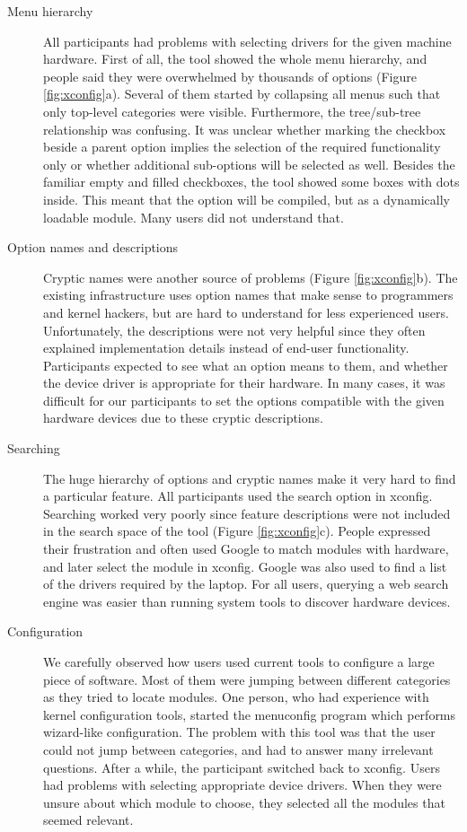 \documentclass{chi2009}
\begin{document}
\begin{description}
  \item[Menu hierarchy]
All participants had problems with selecting drivers for the given machine hardware. First of all, the tool showed the whole menu hierarchy, and people said
they were overwhelmed by thousands of options (Figure \ref{fig:xconfig}a). Several of them started by collapsing all menus such that only top-level categories
were visible. Furthermore, the tree/sub-tree relationship was confusing. It was unclear whether marking the checkbox beside a parent option implies the
selection of the required functionality only or whether additional sub-options will be selected as well. Besides the familiar empty and filled checkboxes, the
tool showed some boxes with dots inside. This meant that the option will be compiled, but as a dynamically loadable module. Many users did not understand that.

  \item[Option names and descriptions]
Cryptic names were another source of problems (Figure \ref{fig:xconfig}b). The existing infrastructure uses option names that make sense to programmers and
kernel hackers, but are hard to understand for less experienced users. Unfortunately, the descriptions were not very helpful since they often explained
implementation details instead of end-user functionality. Participants expected to see what an option means to them, and whether the device driver is
appropriate for their hardware. In many cases, it was difficult for our participants to set the options compatible with the given hardware devices due to these
cryptic descriptions.

  \item[Searching]
The huge hierarchy of options and cryptic names make it very hard to find a particular feature. All participants used the search option in \textsf{xconfig}.
Searching worked very poorly since feature descriptions were not included in the search space of the tool (Figure \ref{fig:xconfig}c). People expressed their
frustration and often used Google to match modules with hardware, and later select the module in \textsf{xconfig}. Google was also used to find a list of the
drivers required by the laptop. For all users, querying a web search engine was easier than running system tools to discover hardware devices.

  \item[Configuration]
We carefully observed how users used current tools to configure a large piece of software. Most of them were jumping between different categories as they tried
to locate modules. One person, who had experience with kernel configuration tools, started the \textsf{menuconfig} program which performs wizard-like
configuration. The problem with this tool was that the user could not jump between categories, and had to answer many irrelevant questions. After a while, the
participant switched back to \textsf{xconfig}. Users had problems with selecting appropriate device drivers. When they were unsure about which module to choose,
they selected all the modules that seemed relevant. 
\end{description}
\end{document}
